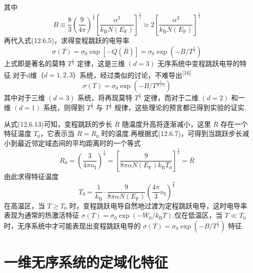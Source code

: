 其中
\begin{equation}
  B\equiv\frac{8}{3}\left(\frac{9}{4\pi}\right)^{\frac{1}{4}}
  \left[\frac{\alpha^{3}}{k_{\mathrm{B}}N\left(E_{\mathrm{F}}\right)}\right]^{\frac{1}{4}}
  \approx2\left[\frac{\alpha^{3}}{k_{\mathrm{B}}N\left(E_{\mathrm{F}}\right)}\right]^{\frac{1}{4}}
\end{equation}
再代入式(12.6.5)，求得变程跳跃的电导率
\begin{equation}
  \sigma\left(T\right)=\sigma_{0}\exp\left[-Q\left(\overline{R}\right)\right]
  =\sigma_{0}\exp\left(-B/T^{\frac{1}{4}}\right)
\end{equation}
上式即是著名的莫特 $T^{\frac{1}{4}}$ 定律，这是三维 $\left(d=3\right)$ 无序系统中变程跳跃电导的特征.对于d维（$d=1,2,3$）系统，经过类似的讨论，不难导出\textsuperscript{[16]}
\begin{equation}
  \sigma\left(T\right)=\sigma_{0}\exp\left(-B/T^{\frac{1}{d+1}}\right)
\end{equation}
其中对于三维 $\left(d=3\right)$ 系统，将再现莫特 $T^{\frac{1}{4}}$ 定律，而对于二维 $\left(d=2\right)$ 和一维 $\left(d=1\right)$ 系统，则得到 $T^{\frac{1}{3}}$ 与 $T^{\frac{1}{2}}$ 规律，这些理论的预言都已得到实验的证实.

从式(12.6.13)可知，变程跳跃的步长 $\overline{R}$ 随温度升高将逐渐减小，这里 $\overline{R}$ 存在一个特征温度 $T_{0}$，它表示当 $\overline{R}=R_{0}$ 时的温度.再根据式(12.6.7)，可得到当跳跃步长减小到最近邻定域态间的平均距离时的一个等式
\begin{equation}
  R_{0}=\left(\frac{3}{4\pi n_{\mathrm{I}}}\right)^{\frac{1}{3}}
  =\left[\frac{9}{8\pi\alpha N\left(E_{\mathrm{F}}\right)k_{\mathrm{B}}T_{0}}\right]^{\frac{1}{4}}
  =\overline{R}
\end{equation}
由此求得特征温度
\begin{equation}
  T_{0}=\frac{1}{k_{\mathrm{B}}}\cdot\frac{9}{8\pi\alpha N\left(E_{\mathrm{F}}\right)}
  \left(\frac{4\pi}{3}n_{\mathrm{I}}\right)^{\frac{4}{3}}
\end{equation}
在高温区，当 $T\geqslant T_{0}$ 时，变程跳跃电导自然地过渡为定程跳跃电导，这时电导率表现为通常的热激活特征 $\sigma\left(T\right)=\sigma_{0}\exp\left(-W_{0}/k_{\mathrm{B}}T\right)$.仅在低温区，当 $T\ll T_{0}$ 时，无序系统中才可能表现出变程跳跃电导的 $\sigma\left(T\right)=\sigma_{0}\exp\left(-B/T^{\frac{1}{4}}\right)$ 特征.

\section{一维无序系统的定域化特征}


